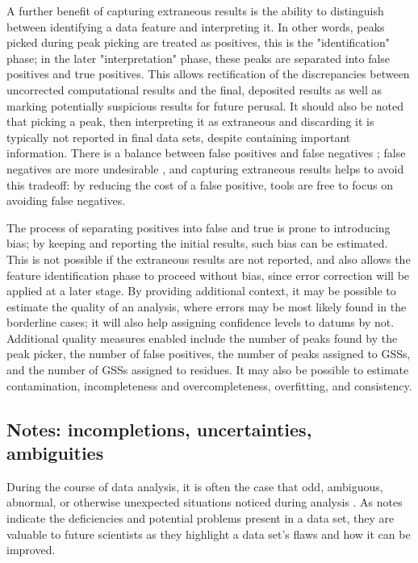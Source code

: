 A further benefit of capturing extraneous results is the ability to distinguish
between identifying a data feature and interpreting it.  In other words, peaks
picked during peak picking are treated as positives, this is the "identification"
phase; in the later "interpretation" phase, these peaks are separated into
false positives and true positives.  This allows rectification of the 
discrepancies between uncorrected computational results and the final,
deposited results as well as marking potentially suspicious results for 
future perusal.  It should also be noted that picking a peak, then
interpreting it as extraneous and discarding it is typically not reported in
final data sets, despite containing important information.
There is a balance between false positives and false negatives \cite{pine};
false negatives are more undesirable \cite{pine, saga, guntert2009automated},
and capturing extraneous results helps to avoid this tradeoff: by reducing
the cost of a false positive, tools are free to focus on avoiding false
negatives.

The process of separating positives into false and true is prone to 
introducing bias; by keeping and reporting the initial results, such bias
can be estimated.  This is not possible if the extraneous results are not
reported, and also allows the feature identification phase to proceed
without bias, since error correction will be applied at a later stage. 
By providing additional context, it may be possible to estimate the quality 
of an analysis, where errors may be most likely found in the borderline 
cases; it will also help assigning confidence levels to datums by not.
Additional quality measures enabled include the number of peaks found by the
peak picker, the number of false positives, the number of peaks assigned to
GSSs, and the number of GSSs assigned to residues.  It may also be possible
to estimate contamination, incompleteness and overcompleteness, overfitting, 
and consistency.


\subsection*{Notes: incompletions, uncertainties, ambiguities}
During the course of data analysis, it is often the case that odd, ambiguous,
abnormal, or otherwise unexpected situations noticed during analysis
\cite{nuseibeh2000inconsistency}.  
As notes indicate the deficiencies and 
potential problems present in a data set, they are valuable to future 
scientists as they highlight a data set's flaws and how it can be improved.

